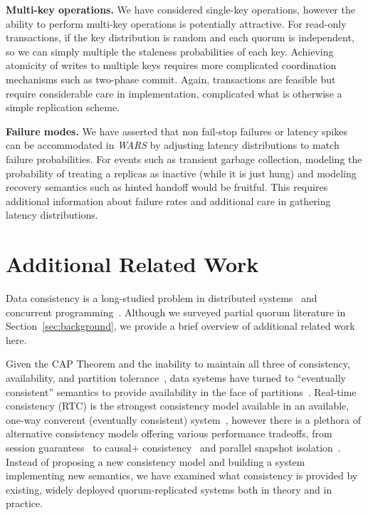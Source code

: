 \documentclass{vldb}
\begin{document}
\textbf{Multi-key operations.} We have considered single-key operations,
however the ability to perform multi-key operations is potentially
attractive.  For read-only transactions, if the key distribution is
random and each quorum is independent, so we can simply multiple the
staleness probabilities of each key.  Achieving atomicity of writes to
multiple keys requires more complicated coordination mechanisms such
as two-phase commit.  Again, transactions are feasible but require
considerable care in implementation, complicated what is otherwise a
simple replication scheme.

\textbf{Failure modes.} We have asserted that non fail-stop failures
or latency spikes can be accommodated in \textit{WARS} by adjusting
latency distributions to match failure probabilities.  For events such
as transient garbage collection, modeling the probability of treating
a replicas as inactive (while it is just hung) and modeling recovery
semantics such as hinted handoff would be fruitful.  This requires
additional information about failure rates and additional care in
gathering latency distributions.

\section{Additional Related Work}
\label{sec:relatedwork}

Data consistency is a long-studied problem in distributed
systems~\cite{consistency-partitioned, danger-rep} and concurrent
programming~\cite{linearizability}.  Although we surveyed partial
quorum literature in Section~\ref{sec:background}, we provide a brief
overview of additional related work here.

Given the CAP Theorem and the inability to maintain all three of
consistency, availability, and partition tolerance~\cite{cap-proof},
data systems have turned to ``eventually consistent'' semantics to
provide availability in the face of
partitions~\cite{consistency-partitioning, vogels-defs}.  Real-time
consistency (RTC) is the strongest consistency model available in an
available, one-way converent (eventually consistent)
system~\cite{rtc-proof}, however there is a plethora of alternative
consistency models offering various performance tradeoffs, from
session guarantess~\cite{sessionguarantees} to causal+
consistency~\cite{cops} and parallel snapshot isolation~\cite{walter}.
Instead of proposing a new consistency model and building a system
implementing new semantics, we have examined what consistency is
provided by existing, widely deployed quorum-replicated systems both
in theory and in practice.
\end{document}
